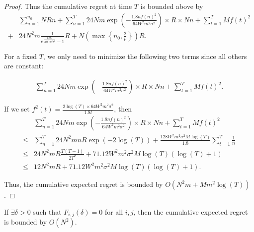 \begin{proof}
                          Thus the cumulative regret at time $T$ is bounded above by
                          \begin{align}
                          &\sum_{n=1}^{n_{0}}NRn + \sum_{n=1}^{T} 24Nm\exp\left(-\frac{1.8n f(n)^2}{64 W^2 m^2\sigma^2}\right)\times R \times Nn+ \sum_{t=1}^{T}Mf(t)^2 \nonumber \\
                            + & 24N^2 m \frac{1}{e^{\frac{1.8\delta_{0}}{64W^2 m^2\sigma^2}}-1}R+N\left(\max\left\{n_{0},\frac{2}{p}\right\}\right)R. \nonumber
                            \end{align}

                            For a fixed $T$, we only need to minimize the following two terms since all others are constant:

                            \begin{align}
                            \sum_{n=1}^{T} 24Nm\exp\left(-\frac{1.8n f(n)^2}{64 W^2 m^2\sigma^2}\right)\times R \times Nn+ \sum_{t=1}^{T}Mf(t)^2. \label{equ:regret}
                            \end{align}


                            If we set $f^2(t)=\frac{2\log(T)\times 64W^2 m^2\sigma^2}{1.8t}$, then
                            \begin{align}
                            &\sum_{n=1}^{T} 24Nm\exp\left(-\frac{1.8n f(n)^2}{64 W^2 m^2\sigma^2}\right)\times R \times Nn+ \sum_{t=1}^{T}Mf(t)^2 \nonumber \\ 
                            \leq & \sum_{n=1}^{T} 24N^2 mnR \exp\left(-2\log(T)\right)  + \frac{128W^2 m^2\sigma^2 M\log(T)}{1.8}\sum_{t=1}^{T}\frac{1}{n} \nonumber \\
                              \leq &  24N^2 m R\frac{T(T-1)}{2T^2}  + 71.12 W^2 m^2\sigma^2 M\log(T)(\log(T)+1) \nonumber \\
                              \leq &  12 N^2 m R  + 71.12 W^2 m^2\sigma^2 M\log(T)(\log(T)+1). \nonumber
                              \end{align}

                              Thus, the cumulative expected regret is bounded by $O(N^2 m + M m^2\log(T))$.
                              \end{proof}

                              \begin{corollary}
                              If $\exists \delta>0$ such that $F_{i,j}(\delta)=0$ for all $i,j$, then the cumulative expected regret is bounded by $O(N^2)$.
                              \end{corollary}


